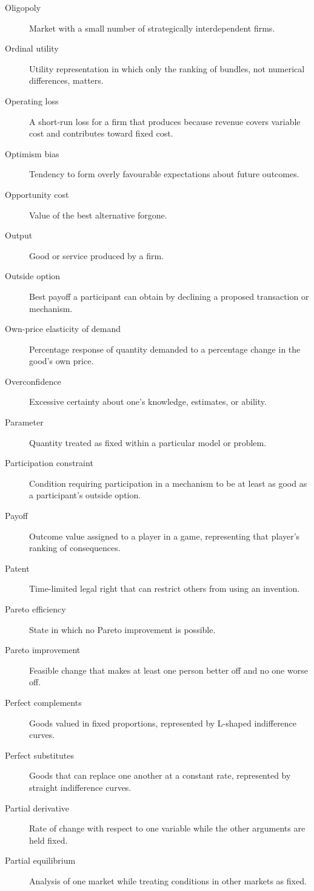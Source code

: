 \begin{description}
  \item[Oligopoly] Market with a small number of strategically interdependent firms.
  \item[Ordinal utility] Utility representation in which only the ranking of bundles, not numerical differences, matters.
  \item[Operating loss] A short-run loss for a firm that produces because revenue covers variable cost and contributes toward fixed cost.
  \item[Optimism bias] Tendency to form overly favourable expectations about future outcomes.
  \item[Opportunity cost] Value of the best alternative forgone.
  \item[Output] Good or service produced by a firm.
  \item[Outside option] Best payoff a participant can obtain by declining a proposed transaction or mechanism.
  \item[Own-price elasticity of demand] Percentage response of quantity demanded to a percentage change in the good's own price.
  \item[Overconfidence] Excessive certainty about one's knowledge, estimates, or ability.
  \item[Parameter] Quantity treated as fixed within a particular model or problem.
  \item[Participation constraint] Condition requiring participation in a mechanism to be at least as good as a participant's outside option.
  \item[Payoff] Outcome value assigned to a player in a game, representing that player's ranking of consequences.
  \item[Patent] Time-limited legal right that can restrict others from using an invention.
  \item[Pareto efficiency] State in which no Pareto improvement is possible.
  \item[Pareto improvement] Feasible change that makes at least one person better off and no one worse off.
  \item[Perfect complements] Goods valued in fixed proportions, represented by L-shaped indifference curves.
  \item[Perfect substitutes] Goods that can replace one another at a constant rate, represented by straight indifference curves.
  \item[Partial derivative] Rate of change with respect to one variable while the other arguments are held fixed.
  \item[Partial equilibrium] Analysis of one market while treating conditions in other markets as fixed.

\end{description}
